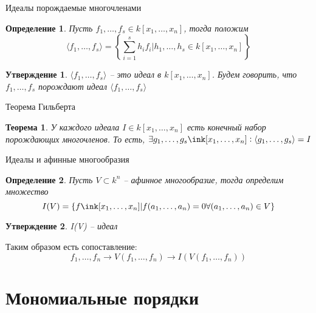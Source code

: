 \documentclass[notheorems,aspectratio=169]{beamer}
\newtheorem{theorem}{Теорема}
\newtheorem{definition}{Определение}
\newtheorem{statement}{Утверждение}
\begin{document}
\begin{frame} {Идеалы порождаемые многочленами} 
    \begin{definition}
         Пусть $f_1,\dots, f_s \in k[x_1, \dots, x_n]$, тогда положим 
        $$
            \langle f_1,\dots, f_s\rangle = \left\lbrace\sum_{i = 1}^s h_i f_i| h_1,\dots, h_s \in k[x_1, \dots, x_n]\right\rbrace
        $$
    \end{definition}
    
    \begin{statement}
    $\langle f_1,\dots, f_s\rangle$ -- это идеал в $k[x_1, \dots, x_n]$. Будем говорить, что $f_1,\dots, f_s$ порождают идеал $\langle f_1,\dots, f_s\rangle$
    \end{statement}
\end{frame}

\begin{frame}{Теорема Гильберта}
    \begin{theorem}
     У каждого идеала $I\in k[x_1,\dots, x_n]$ есть конечный набор порождающих многочленов. То есть, $\exists g_1,\dots, g_s\ink[x_1,\dots, x_n] : \langle g_1,\dots, g_s \rangle = I$
    \end{theorem}
\end{frame}

\begin{frame}{Идеалы и афинные многообразия}
    \begin{definition}
    Пусть $V\subset k^n$ -- афинное многообразие, тогда определим множество
    $$ 
        I(V) = \{f\ink[x_1, \dots, x_n]|f(a_1, \dots, a_n) = 0 \forall (a_1,\dots, a_n)\in V\}
    $$
    \end{definition}
    \begin{statement}
        I(V) -- идеал
    \end{statement}
    Таким образом есть сопоставление:
    $$
        f_1,\dots, f_n \rightarrow V(f_1,\dots, f_n) \rightarrow I(V(f_1,\dots, f_n))
    $$
\end{frame}

\section{Мономиальные порядки}
\end{document}
